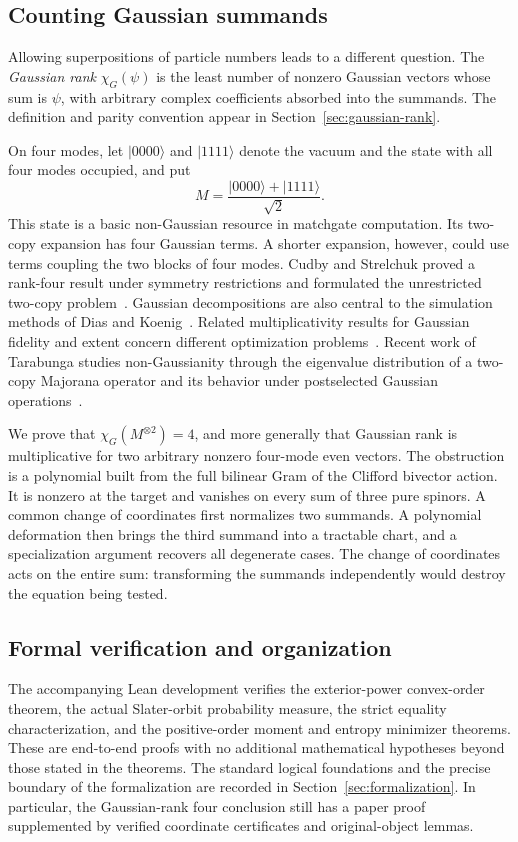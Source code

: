 \subsection{Counting Gaussian summands}
Allowing superpositions of particle numbers leads to a different question.
The \emph{Gaussian rank} $\chi_G(\psi)$ is the least number of nonzero
Gaussian vectors whose sum is $\psi$, with arbitrary complex coefficients
absorbed into the summands. The definition and parity convention appear in
Section~\ref{sec:gaussian-rank}.

On four modes, let $|0000\rangle$ and $|1111\rangle$ denote the vacuum and
the state with all four modes occupied, and put
\[
 M=\frac{|0000\rangle+|1111\rangle}{\sqrt2}.
\]
This state is a basic non-Gaussian resource in matchgate computation. Its
two-copy expansion has four Gaussian terms. A shorter expansion, however,
could use terms coupling the two blocks of four modes. Cudby and Strelchuk
proved a rank-four result under symmetry restrictions and formulated the
unrestricted two-copy problem~\cite{cudby2023}. Gaussian decompositions are
also central to the simulation methods of Dias and Koenig~\cite{diaskoenig2024}.
Related multiplicativity results for Gaussian fidelity and extent concern
different optimization problems~\cite{reardon2024}.
Recent work of Tarabunga studies non-Gaussianity through the eigenvalue
distribution of a two-copy Majorana operator and its behavior under
postselected Gaussian operations~\cite{tarabunga2026}.

We prove that $\chi_G(M^{\otimes2})=4$, and more generally that Gaussian
rank is multiplicative for two arbitrary nonzero four-mode even vectors.
The obstruction is a polynomial built from the full bilinear Gram of the
Clifford bivector action. It is nonzero at the target and vanishes on every
sum of three pure spinors. A common change of coordinates first normalizes
two summands. A polynomial deformation then brings the third summand into
a tractable chart, and a specialization argument recovers all degenerate
cases. The change of coordinates acts on the entire sum: transforming the
summands independently would destroy the equation being tested.

\subsection{Formal verification and organization}
The accompanying Lean development verifies the exterior-power
convex-order theorem, the actual Slater-orbit probability measure, the
strict equality characterization, and the positive-order moment and entropy
minimizer theorems. These are end-to-end proofs with no additional
mathematical hypotheses beyond those stated in the theorems. The standard
logical foundations and the precise boundary of the formalization are
recorded in Section~\ref{sec:formalization}. In particular, the Gaussian-rank
four conclusion still has a paper proof supplemented by verified coordinate
certificates and original-object lemmas.

